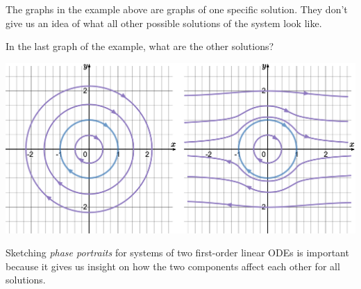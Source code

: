 The graphs in the example above are graphs of one specific solution. 
They don't give us an idea of what all other possible solutions of the system look like.

\begin{example}
In the last graph of the example, what are the other solutions?

\begin{center}
\includegraphics*[width=420pt]{images/module17-possiblephaseportraits.pdf}
\end{center}

\end{example}


Sketching \emph{phase portraits} for systems of two first-order linear ODEs is important because it gives us insight on how the two components affect each other for all solutions.

